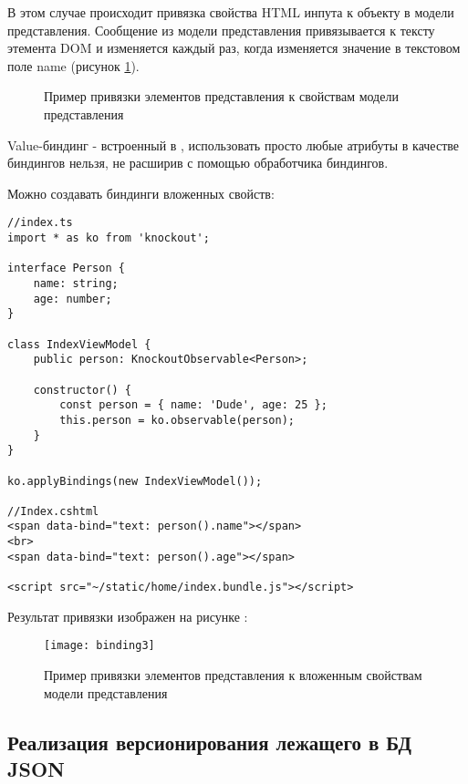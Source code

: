 \documentclass[a4paper,14pt]{extarticle}
\begin{document}
В этом случае происходит привязка свойства  HTML инпута к объекту в
модели представления. Сообщение  из модели представления
привязывается к тексту этемента DOM и изменяется каждый раз, когда изменяется
значение в текстовом поле name (рисунок \ref{fig:binding12}).

\begin{figure}[H]
    \centering
    \hspace{.15\linewidth}
    \caption{Пример привязки элементов представления к свойствам модели представления}
    \label{fig:binding12}
\end{figure}

Value-биндинг - встроенный в , использовать просто любые атрибуты в качестве биндингов
нельзя, не расширив  с помощью обработчика биндингов.

Можно создавать биндинги вложенных свойств:

\begin{lstlisting}
//index.ts
import * as ko from 'knockout';

interface Person {
    name: string;
    age: number;
}

class IndexViewModel {
    public person: KnockoutObservable<Person>;

    constructor() {
        const person = { name: 'Dude', age: 25 };
        this.person = ko.observable(person);
    }
}

ko.applyBindings(new IndexViewModel());

//Index.cshtml
<span data-bind="text: person().name"></span>
<br>
<span data-bind="text: person().age"></span>

<script src="~/static/home/index.bundle.js"></script>
\end{lstlisting}

Результат привязки изображен на рисунке :

\begin{figure}[H]
    \centering
    \texttt{[image: binding3]}
    \caption{Пример привязки элементов представления к вложенным свойствам модели представления}
    \label{fig:binding3}
\end{figure}

\subsection{Реализация версионирования лежащего в БД JSON}
\end{document}
